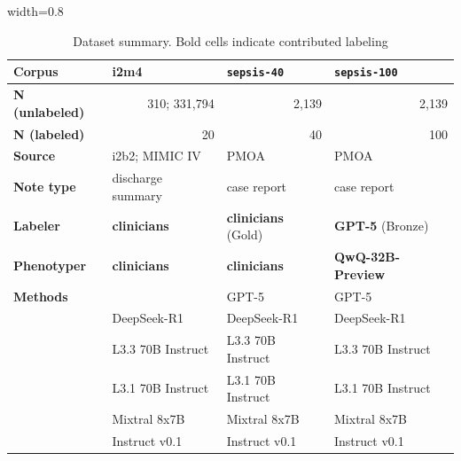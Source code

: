 \begin{table}[tb!]
\caption{Dataset summary. Bold cells indicate contributed labeling}
\label{tab:dataset-summary}

\centering
\begin{adjustbox}{width=0.8\textwidth}
\begin{tabular}{|p{3.5cm}|p{3.5cm}|p{3.5cm}|p{3.5cm}|}
\hline
\textbf{Corpus}                  & \centering \textbf{i2m4}             & \centering \textbf{\texttt{sepsis-40}}& \textbf{\qquad \texttt{sepsis-100}}       \\
\hline
\textbf{N (unlabeled)}          & \multicolumn{1}{r|}{310;  331,794}             & \multicolumn{1}{r|}{2,139}                     & \multicolumn{1}{r|}{2,139}                      \\ \hline
\textbf{N (labeled)}            & \multicolumn{1}{r|}{20}                         & \multicolumn{1}{r|}{40}                       & \multicolumn{1}{r|}{100}                       \\ \hline
\textbf{Source}                 & i2b2; MIMIC IV           & PMOA       & PMOA       \\ \hline
\textbf{Note type}              & discharge summary        & case report              & case report               \\ \hline
\textbf{Labeler}                & \textbf{clinicians}               & \textbf{clinicians} (Gold)& \textbf{GPT-5} (Bronze)\\ \hline
\textbf{Phenotyper}             & \textbf{clinicians}      & \textbf{clinicians}      & \textbf{QwQ-32B-Preview}             \\ \hline
\textbf{Methods}                &                & GPT-5& GPT-5\\ 
                                & DeepSeek-R1& DeepSeek-R1& DeepSeek-R1\\ 
                                & L3.3 70B Instruct                  & L3.3 70B Instruct                & L3.3 70B Instruct                 \\ 
                                & L3.1 70B Instruct                 & L3.1 70B Instruct                & L3.1 70B Instruct   \\ 
                                & Mixtral 8x7B & Mixtral 8x7B                & Mixtral 8x7B                   \\ 
                                & \quad Instruct v0.1 & \quad Instruct v0.1                & \quad Instruct v0.1                   \\ 

\end{tabular}
\end{adjustbox}
\end{table}
